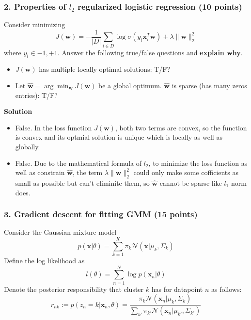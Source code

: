 \documentclass[12pt]{article}%
\begin{document}
\newpage

\newpage


\subsubsection*{2. Properties of $l_2$ regularized logistic regression (10 points)}
Consider minimizing
\[
J(\mathbf{w}) = -\frac{1}{|D|}\sum_{i\in D} \log \sigma(y_i\mathbf{x}_i^T\mathbf{w})+\lambda\|\mathbf{w}\|_2^2
\]
where $y_i\in {-1,+1}$. Answer the following true/false questions and \textbf{explain why}.
\begin{itemize}
\item $J(\mathbf{w})$ has multiple locally optimal solutions: T/F?
\item Let $\hat{\mathbf{w}}=\arg\min_{\mathbf{w}}J(\mathbf{w})$ be a global optimum. $\hat{\mathbf{w}}$ is sparse (has many zeros entries): T/F?
\end{itemize}
\textbf{Solution}
\begin{itemize}
	\item False. In the loss function $ J(\textbf{w}) $, both two terms are convex, so the function is convex and its optmial solution is unique which is locally as well as globally.
	\item False. Due to the mathematical formula of $ l_2 $, to minimize the loss function as well as constrain $ \hat{\mathbf{w}} $, the term $ \lambda\|\mathbf{w}\|_2^2 $ could only make some cofficients as small as possible but can't eliminite them, so $ \hat{\mathbf{w}} $ cannot be sparse like $ l_1 $ norm does. 
\end{itemize}

\newpage


\subsubsection*{3. Gradient descent for fitting GMM (15 points)}
Consider the Gaussian mixture model
\[p(\mathbf{x}|\theta)=\sum_{k=1}^{K} \pi_{k} \mathcal{N}(\mathbf{x}|\mu_k,\Sigma_k)\]
Define the log likelihood as
\[ l(\theta) = \sum_{n=1}^N \log p(\mathbf{x}_n|\theta)
\]
Denote the posterior responsibility that cluster $k$ has for datapoint $n$ as follows:
\[
r_{nk}:=p(z_n=k|\mathbf{x}_n,\theta) = \frac{\pi_k\mathcal{N}(\mathbf{x}_n|\mu_k,\Sigma_k)}{\sum_{k'}\pi_{k'}\mathcal{N}(\mathbf{x}_n|\mu_{k'},\Sigma_{k'})}
\]
 
\end{document}
